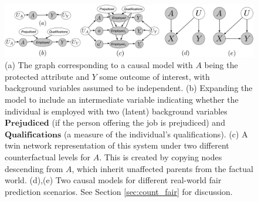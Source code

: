 \begin{figure}
\centerline{\includegraphics[width=\textwidth]{best_of_both.pdf}}
\caption{\label{fig:ex1} (a) The graph corresponding to
    a causal model with $A$ being the protected attribute and $Y$ some
    outcome of interest, with background variables assumed to be
    independent.  (b) Expanding the model to include an intermediate
    variable indicating whether the individual is employed with two
    (latent) background variables $\textbf{Prejudiced}$ (if the person
    offering the job is prejudiced) and $\textbf{Qualifications}$ (a
    measure of the individual's qualifications). (c) A twin network
    representation of this system \citep{pearl:00} under two different
    counterfactual levels for $A$. This is created by copying nodes
    descending from $A$, which inherit unaffected parents from the
    factual world. (d),(e) Two causal models for different
    real-world fair prediction scenarios.\label{figure.simple_models}
    See Section \ref{sec:count_fair} for discussion.}
\end{figure}


